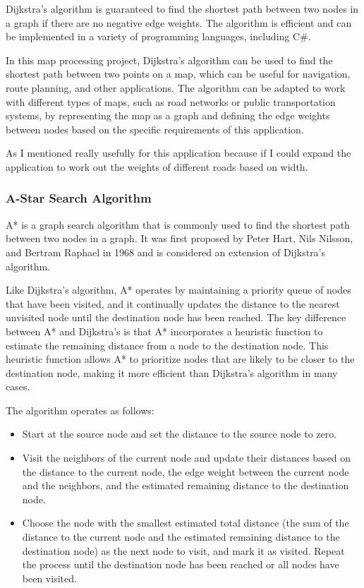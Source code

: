 \begin{FlushLeft}
    Dijkstra's algorithm is guaranteed to find the shortest path between two nodes in a graph if there are no negative edge weights. The algorithm is efficient and can be implemented in a variety of programming languages, including C#.\\ \bk

    In this map processing project, Dijkstra's algorithm can be used to find the shortest path between two points on a map, which can be useful for navigation, route planning, and other applications. The algorithm can be adapted to work with different types of maps, such as road networks or public transportation systems, by representing the map as a graph and defining the edge weights between nodes based on the specific requirements of this application. \\ \bk

    As I mentioned really usefully for this application because if I could expand the application to work out the weights of different roads based on width. \\ 
    \bk
    
    \subsubsection{A-Star Search Algorithm}
    A* is a graph search algorithm that is commonly used to find the shortest path between two nodes in a graph. It was first proposed by Peter Hart, Nils Nilsson, and Bertram Raphael in 1968 and is considered an extension of Dijkstra's algorithm. \\ \bk

    Like Dijkstra's algorithm, A* operates by maintaining a priority queue of nodes that have been visited, and it continually updates the distance to the nearest unvisited node until the destination node has been reached. The key difference between A* and Dijkstra's is that A* incorporates a heuristic function to estimate the remaining distance from a node to the destination node. This heuristic function allows A* to prioritize nodes that are likely to be closer to the destination node, making it more efficient than Dijkstra's algorithm in many cases. \\ \bk

    The algorithm operates as follows:
    \begin{itemize}
        \item Start at the source node and set the distance to the source node to zero.
        \item Visit the neighbors of the current node and update their distances based on the distance to the current node, the edge weight between the current node and the neighbors, and the estimated remaining distance to the destination node.
        \item Choose the node with the smallest estimated total distance (the sum of the distance to the current node and the estimated remaining distance to the destination node) as the next node to visit, and mark it as visited. Repeat the process until the destination node has been reached or all nodes have been visited.
    \end{itemize}


\end{FlushLeft}
